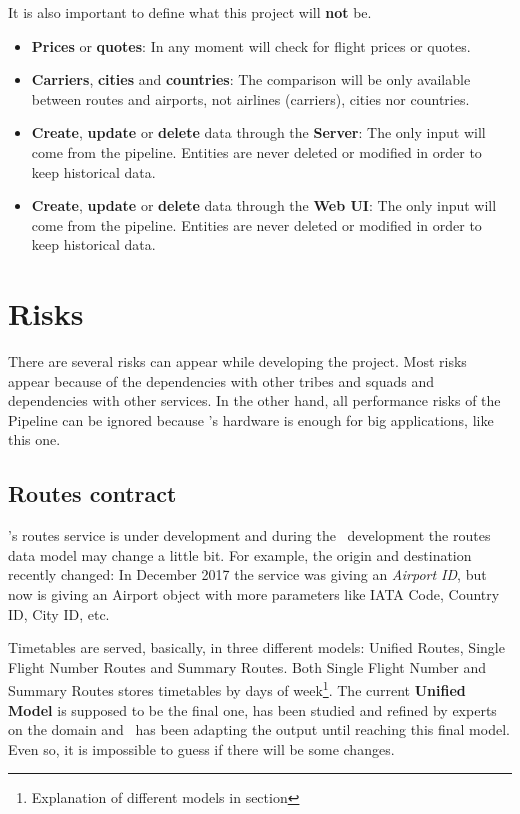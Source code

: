 It is also important to define what this project will \textbf{not} be.

\begin{itemize}
  \item \textbf{Prices} or \textbf{quotes}: In any moment will check for flight prices or quotes.
  \item \textbf{Carriers}, \textbf{cities} and \textbf{countries}: The comparison will be only available between routes and airports, not airlines (carriers), cities nor countries.
  \item \textbf{Create}, \textbf{update} or \textbf{delete} data through the \textbf{Server}: The only input will come from the pipeline. Entities are never deleted or modified in order to keep historical data.
  \item \textbf{Create}, \textbf{update} or \textbf{delete} data through the \textbf{Web UI}: The only input will come from the pipeline. Entities are never deleted or modified in order to keep historical data.
\end{itemize}


\section{Risks}

There are several risks can appear while developing the project. Most risks appear because of the dependencies with other tribes and squads and dependencies with other services. In the other hand, all performance risks of the Pipeline can be ignored because \company's hardware is enough for big applications, like this one.

\subsection{Routes contract}

\squad's routes service is under development and during the \thesis\ development the routes data model may change a little bit. For example, the origin and destination recently changed: In December 2017 the service was giving an \textit{Airport ID}, but now is giving an Airport object with more parameters like IATA Code\cite{iata_code}, Country ID, City ID, etc.

Timetables are served, basically, in three different models: Unified Routes, Single Flight Number Routes and Summary Routes. Both Single Flight Number and Summary Routes stores timetables by days of week\footnote{Explanation of different models in section }. The current \textbf{Unified Model} is supposed to be the final one, has been studied and refined by experts on the domain and \squad\ has been adapting the output until reaching this final model. Even so, it is impossible to guess if there will be some changes.

